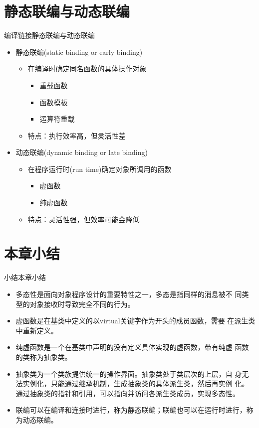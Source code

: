 \section[联编]{静态联编与动态联编}\label{sec:chap06-sec03}
\begin{frame}[t, fragile]{编译链接}{静态联编与动态联编}%
  \stretchon
  \begin{itemize}
  \item 静态联编(static binding or early binding)
    \begin{itemize}
    \item 在编译时确定同名函数的具体操作对象
      \begin{itemize}
      \item 重载函数
      \item 函数模板
      \item 运算符重载
      \end{itemize}
    \item 特点：执行效率高，但灵活性差
    \end{itemize}
  \item 动态联编(dynamic binding or late binding)
    \begin{itemize}
    \item 在程序运行时(run time)确定对象所调用的函数
      \begin{itemize}
      \item 虚函数
      \item 纯虚函数
      \end{itemize}
    \item 特点：灵活性强，但效率可能会降低
    \end{itemize}
  \end{itemize}
  \stretchoff
\end{frame}

\section[小结]{本章小结}\label{sec:chap06-sec04}
\begin{frame}[t]{小结}{本章小结}%
  \stretchon
  \begin{itemize}
  \item \alert{多态性}是面向对象程序设计的重要特性之一，多态是指同样的消息被不
    同类型的对象接收时导致完全不同的行为。
  \item \alert{虚函数}是在基类中定义的以virtual关键字作为开头的成员函数，需要
    在派生类中重新定义。
  \item \alert{纯虚函数}是一个在基类中声明的没有定义具体实现的虚函数，带有纯虚
    函数的类称为抽象类。
  \item \alert{抽象类}为一个类族提供统一的操作界面。抽象类处于类层次的上层，自
    身无法实例化，只能通过继承机制，生成抽象类的具体派生类，然后再实例
    化。通过抽象类的指针和引用，可以指向并访问各派生类成员，实现多态性。
  \item 联编可以在编译和连接时进行，称为\alert{静态联编}；联编也可以在运行时进行，称为\alert{动态联编}。
  \end{itemize}
  \stretchoff
\end{frame}

